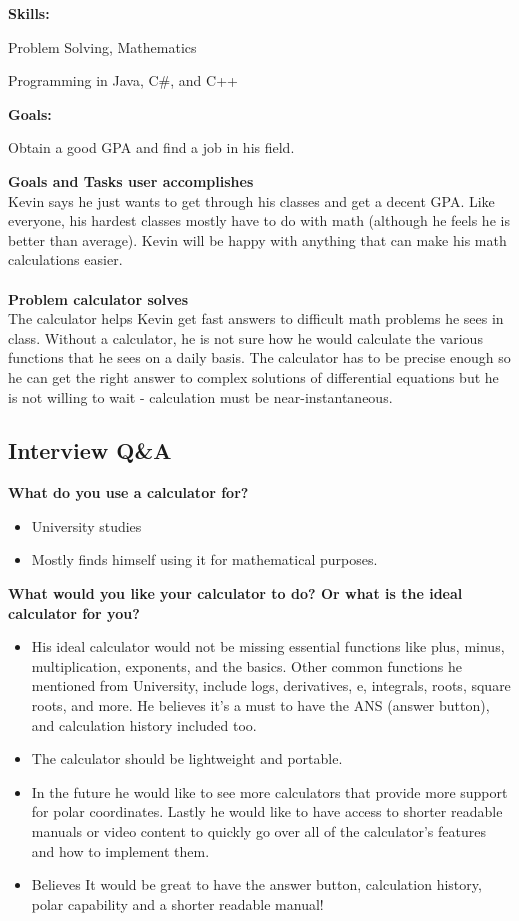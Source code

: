 \documentclass{article}
\begin{document}
\textbf{Skills:}
\begin{compactitem}
\item Problem Solving, Mathematics
\item Programming in Java, C\#, and C++
\end{compactitem}

\textbf{Goals:}
\begin{compactitem}
\item Obtain a good GPA and find a job in his field.
\end{compactitem}
\bigskip 
\textbf{Goals and Tasks user accomplishes}\\
Kevin says he just wants to get through his classes and get a decent GPA. Like everyone, his hardest classes mostly have to do with math (although he feels he is better than average). Kevin will be happy with anything that can make his math calculations easier.\\ \\
\textbf{Problem calculator solves} \\
The calculator helps Kevin get fast answers to difficult math problems he sees in class. Without a calculator, he is not sure how he would calculate the various functions that he sees on a daily basis. The calculator has to be precise enough so he can get the right answer to complex solutions of differential equations but he is not willing to wait - calculation must be near-instantaneous.
\pagebreak

\subsection*{Interview Q\&A}
\textbf{What do you use a calculator for?}
\begin{itemize}
\itemsep0em 
\item University studies
\item Mostly finds himself using it for mathematical purposes. 
\end{itemize}

\textbf{What would you like your calculator to do? Or what is the ideal calculator for you?}
\begin{itemize}
\itemsep0em 
\item His  ideal calculator would not be missing essential functions like plus, minus, multiplication, exponents, and the basics. Other common functions he mentioned from University, include logs, derivatives, e, integrals, roots, square roots, and more. He believes it’s a must to have the ANS (answer button), and calculation history included too. 
\item The calculator should be lightweight and portable. 
\item In the future he would like to see more calculators that provide more support for polar coordinates. Lastly he would like to have access to shorter readable manuals or video content to quickly go over all of the calculator’s features and how to implement them.
\item Believes It would be great to have the answer button, calculation history, polar capability and a shorter readable manual! 
\end{itemize}
\end{document}
